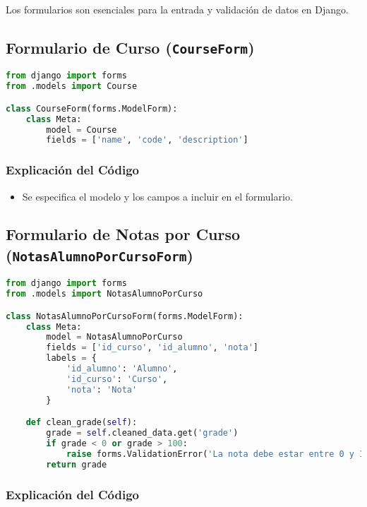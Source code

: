Los formularios son esenciales para la entrada y validación de datos en Django.

\subsection{Formulario de Curso (\texttt{CourseForm})}

\begin{lstlisting}[language=Python, caption=Formulario de Curso]
from django import forms
from .models import Course

class CourseForm(forms.ModelForm):
    class Meta:
        model = Course
        fields = ['name', 'code', 'description']
\end{lstlisting}

\subsubsection{Explicación del Código}

\begin{itemize}
    \item Se especifica el modelo y los campos a incluir en el formulario.
\end{itemize}

\subsection{Formulario de Notas por Curso (\texttt{NotasAlumnoPorCursoForm})}

\begin{lstlisting}[language=Python, caption=Formulario de Notas por Curso]
from django import forms
from .models import NotasAlumnoPorCurso

class NotasAlumnoPorCursoForm(forms.ModelForm):
    class Meta:
        model = NotasAlumnoPorCurso
        fields = ['id_curso', 'id_alumno', 'nota']
        labels = {
            'id_alumno': 'Alumno',
            'id_curso': 'Curso',
            'nota': 'Nota'
        }

    def clean_grade(self):
        grade = self.cleaned_data.get('grade')
        if grade < 0 or grade > 100:
            raise forms.ValidationError('La nota debe estar entre 0 y 100')
        return grade
\end{lstlisting}

\subsubsection{Explicación del Código}

